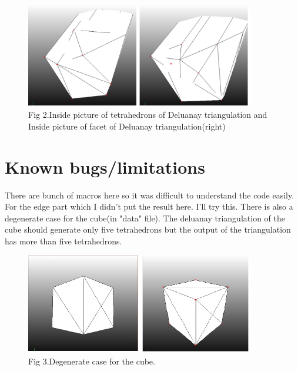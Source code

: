 \documentclass[11pt]{article}
\begin{document}
\begin{figure}[h]
  \includegraphics[width=100mm]{tetr.jpg}\\
  Fig 2.Inside picture of tetrahedrons of Deluanay triangulation and Inside picture of facet of Deluanay triangulation(right)
\end{figure}


\section{Known bugs/limitations}
There are bunch of macros here so it was difficult to understand the code easily.
For the edge part which I didn't put the result here. I'll try this. There is also a degenerate case for the cube(in "data" file). The deluanay triangulation of the cube should generate only five tetrahedrons but the output of the triangulation has more than five tetrahedrons.

\begin{figure}[h]
  \includegraphics[width=100mm]{degen.jpg}\\
  Fig 3.Degenerate case for the cube.
\end{figure}



\end{document}
